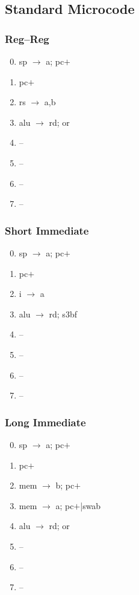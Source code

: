 \documentclass[11pt]{book}
\begin{document}
\subsection*{Standard Microcode}
\begin{multicols}{3}\ttfamily\selectfont\small
  \subsubsection*{Reg--Reg}
  \begin{enumerate}\setcounter{enumi}{-1}
  \item sp \(\rightarrow\) a; pc\(+\)
  \item pc\(+\)
  \item rs \(\rightarrow\) a,b
  \item alu \(\rightarrow\) rd; or
  \item --
  \item --
  \item --
  \item --
  \end{enumerate}
  \columnbreak
  \subsubsection*{Short Immediate}
  \begin{enumerate}\setcounter{enumi}{-1}
  \item sp \(\rightarrow\) a; pc\(+\)
  \item pc\(+\)
  \item i \(\rightarrow\) a
  \item alu \(\rightarrow\) rd; s3bf
  \item --
  \item --
  \item --
  \item --
  \end{enumerate}
  \columnbreak
  \subsubsection*{Long Immediate}
  \begin{enumerate}\setcounter{enumi}{-1}
  \item sp \(\rightarrow\) a; pc\(+\)
  \item pc\(+\)
  \item mem \(\rightarrow\) b; pc\(+\)
  \item mem \(\rightarrow\) a; pc\(+\)|swab
  \item alu \(\rightarrow\) rd; or
  \item --
  \item --
  \item --
  \end{enumerate}
\end{multicols}
\end{document}
